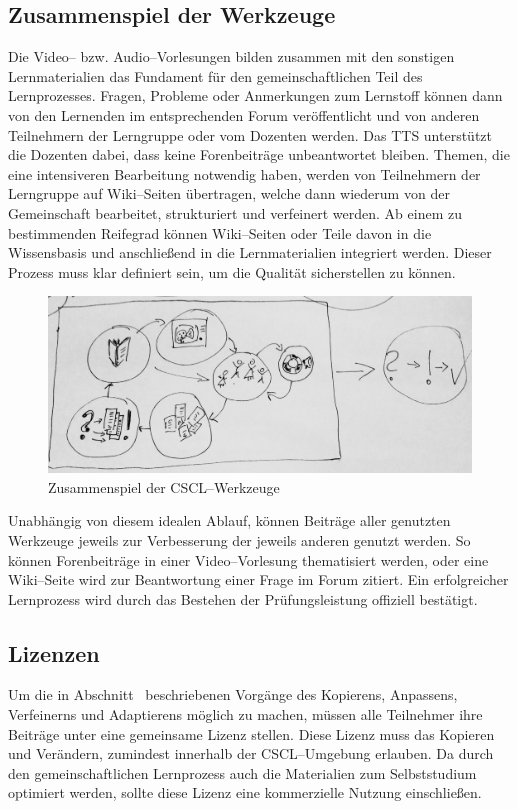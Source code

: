 \subsection{Zusammenspiel der Werkzeuge} %
\label{sub:zusammenspiel_der_werkzeuge}
Die Video– bzw. Audio–Vorlesungen bilden zusammen mit den sonstigen Lernmaterialien das Fundament für den gemeinschaftlichen Teil des Lernprozesses. Fragen, Probleme oder Anmerkungen zum Lernstoff können dann von den Lernenden im entsprechenden Forum veröffentlicht und von anderen Teilnehmern der Lerngruppe oder vom Dozenten werden. Das \ac{TTS} unterstützt die Dozenten dabei, dass keine Forenbeiträge unbeantwortet bleiben.
Themen, die eine intensiveren Bearbeitung notwendig haben, werden von Teilnehmern der Lerngruppe auf Wiki–Seiten übertragen, welche dann wiederum von der Gemeinschaft bearbeitet, strukturiert und verfeinert werden. Ab einem zu bestimmenden Reifegrad können Wiki–Seiten oder Teile davon in die Wissensbasis und anschließend in die Lernmaterialien integriert werden. Dieser Prozess muss klar definiert sein, um die Qualität sicherstellen zu können. 

\begin{figure}[H]
\begin{center}
\includegraphics[width=\textwidth]{tools.jpg}
\caption{Zusammenspiel der CSCL–Werkzeuge}
\label{fig:toos}
\end{center}
\end{figure}

Unabhängig von diesem idealen Ablauf, können Beiträge aller genutzten Werkzeuge jeweils zur Verbesserung der jeweils anderen genutzt werden. So können Forenbeiträge in einer Video–Vorlesung thematisiert werden, oder eine Wiki–Seite wird zur Beantwortung einer Frage im Forum zitiert. Ein erfolgreicher Lernprozess wird durch das Bestehen der Prüfungsleistung offiziell bestätigt.

\subsection{Lizenzen} %
\label{sub:lizenzen}
Um die in Abschnitt~ beschriebenen Vorgänge des Kopierens, Anpassens, Verfeinerns und Adaptierens möglich zu machen, müssen alle Teilnehmer ihre Beiträge unter eine gemeinsame Lizenz stellen. Diese Lizenz muss das Kopieren und Verändern, zumindest innerhalb der \ac{CSCL}–Umgebung erlauben. Da durch den gemeinschaftlichen Lernprozess auch die Materialien zum Selbststudium optimiert werden, sollte diese Lizenz eine kommerzielle Nutzung einschließen. 

